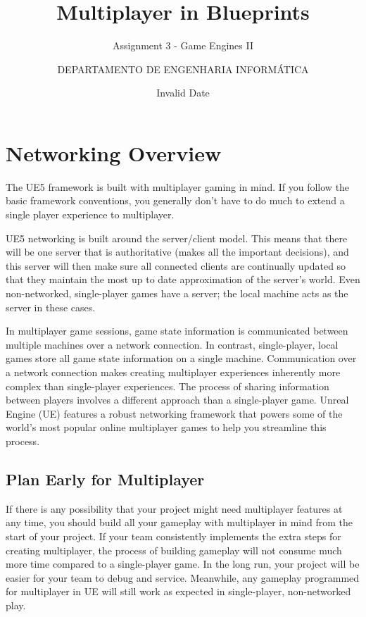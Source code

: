 \documentclass[
  letterpaper,
  DIV=11,
  numbers=noendperiod]{scrartcl}
\title{Multiplayer in Blueprints}
\subtitle{Assignment 3 - Game Engines II}
\author{DEPARTAMENTO DE ENGENHARIA INFORMÁTICA}
\date{Invalid Date}
\renewcommand*\contentsname{Table of contents}
\newcommand\contentsname{Table of contents}
\begin{document}
\maketitle

\renewcommand*\contentsname{Table of contents}
{
\hypersetup{linkcolor=}
\setcounter{tocdepth}{3}
\tableofcontents
}

\section{Networking Overview}\label{networking-overview}

The UE5 framework is built with multiplayer gaming in mind. If you
follow the basic framework conventions, you generally don't have to do
much to extend a single player experience to multiplayer.

UE5 networking is built around the server/client model. This means that
there will be one server that is authoritative (makes all the important
decisions), and this server will then make sure all connected clients
are continually updated so that they maintain the most up to date
approximation of the server's world. Even non-networked, single-player
games have a server; the local machine acts as the server in these
cases.

In multiplayer game sessions, game state information is communicated
between multiple machines over a network connection. In contrast,
single-player, local games store all game state information on a single
machine. Communication over a network connection makes creating
multiplayer experiences inherently more complex than single-player
experiences. The process of sharing information between players involves
a different approach than a single-player game. Unreal Engine (UE)
features a robust networking framework that powers some of the world's
most popular online multiplayer games to help you streamline this
process.

\subsection{Plan Early for
Multiplayer}\label{plan-early-for-multiplayer}

If there is any possibility that your project might need multiplayer
features at any time, you should build all your gameplay with
multiplayer in mind from the start of your project. If your team
consistently implements the extra steps for creating multiplayer, the
process of building gameplay will not consume much more time compared to
a single-player game. In the long run, your project will be easier for
your team to debug and service. Meanwhile, any gameplay programmed for
multiplayer in UE will still work as expected in single-player,
non-networked play.
\end{document}
